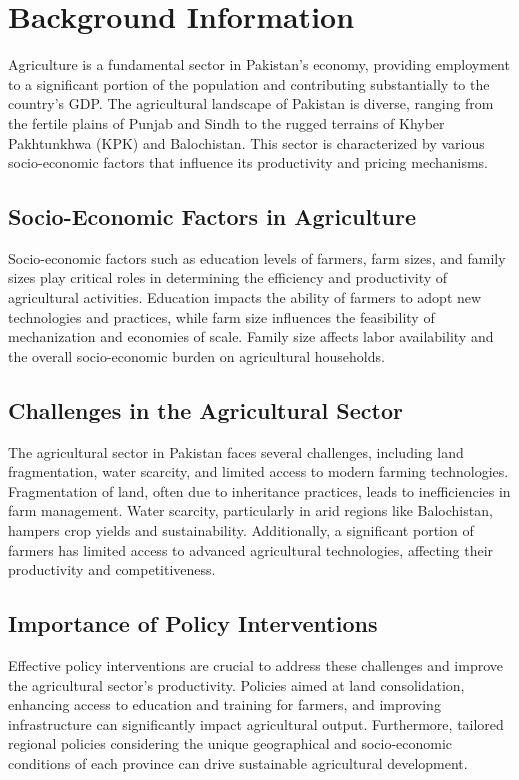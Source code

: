 \documentclass[12pt]{article}
\begin{document}
\section*{Background Information}
Agriculture is a fundamental sector in Pakistan's economy, providing employment to a significant portion of the population and contributing substantially to the country's GDP. The agricultural landscape of Pakistan is diverse, ranging from the fertile plains of Punjab and Sindh to the rugged terrains of Khyber Pakhtunkhwa (KPK) and Balochistan. This sector is characterized by various socio-economic factors that influence its productivity and pricing mechanisms.

\subsection*{Socio-Economic Factors in Agriculture}
Socio-economic factors such as education levels of farmers, farm sizes, and family sizes play critical roles in determining the efficiency and productivity of agricultural activities. Education impacts the ability of farmers to adopt new technologies and practices, while farm size influences the feasibility of mechanization and economies of scale. Family size affects labor availability and the overall socio-economic burden on agricultural households.

\subsection*{Challenges in the Agricultural Sector}
The agricultural sector in Pakistan faces several challenges, including land fragmentation, water scarcity, and limited access to modern farming technologies. Fragmentation of land, often due to inheritance practices, leads to inefficiencies in farm management. Water scarcity, particularly in arid regions like Balochistan, hampers crop yields and sustainability. Additionally, a significant portion of farmers has limited access to advanced agricultural technologies, affecting their productivity and competitiveness.

\subsection*{Importance of Policy Interventions}
Effective policy interventions are crucial to address these challenges and improve the agricultural sector's productivity. Policies aimed at land consolidation, enhancing access to education and training for farmers, and improving infrastructure can significantly impact agricultural output. Furthermore, tailored regional policies considering the unique geographical and socio-economic conditions of each province can drive sustainable agricultural development.
\end{document}

